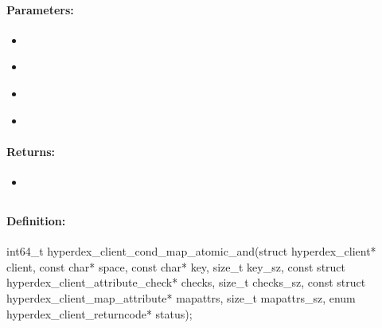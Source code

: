 \paragraph{Parameters:}
\begin{itemize}[noitemsep]
\item {}\\

\item {}\\

\item {}\\

\item {}\\

\end{itemize}

\paragraph{Returns:}
\begin{itemize}[noitemsep]
\item {}\\

\end{itemize}

\pagebreak
\subsection{}
\label{api:c:cond_map_atomic_and}


\paragraph{Definition:}
\begin{ccode}
int64_t hyperdex_client_cond_map_atomic_and(struct hyperdex_client* client,
        const char* space,
        const char* key, size_t key_sz,
        const struct hyperdex_client_attribute_check* checks, size_t checks_sz,
        const struct hyperdex_client_map_attribute* mapattrs, size_t mapattrs_sz,
        enum hyperdex_client_returncode* status);
\end{ccode}

